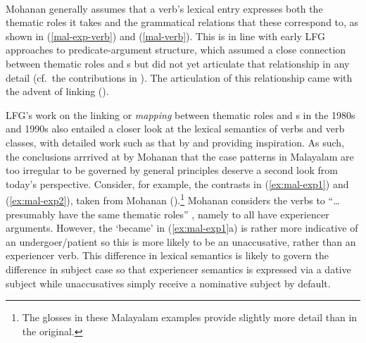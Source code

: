 \documentclass[output=paper,hidelinks]{langscibook}
\begin{document}
\begin{exe}
  \ex \label{mal-exp-verb} 
  \begin{xlist}
\ex {}\\
\ex  {}
\end{xlist}
\end{exe}

Mohanan generally assumes that a verb's lexical entry expresses
both the thematic roles it takes and the grammatical relations that these
correspond to, as shown in (\ref{mal-exp-verb}) and  (\ref{mal-verb}). 
This is in line with early LFG approaches to predicate-argument
structure, which assumed a close connection between thematic roles and
{\GF}s but did not yet articulate that relationship in any detail (cf.~the
contributions in \citealt{buttking2005}).   The articulation of this relationship came
with the advent of linking (). 

\ea \label{mal-verb}
\z

LFG's work on the  linking or {\em mapping} between thematic roles and {\GF}s in the
1980s and 1990s also entailed a closer look at the lexical semantics of verbs
and verb classes, with detailed work such as that by
\citet{jackendoff1990semantic}  and \citet{levin93} 
providing inspiration. As such, the conclusions
arrrived at by Mohanan that the case patterns in Malayalam are too irregular to
be governed by general principles deserve a second look from today's perspective. Consider, for example, the contrasts in (\ref{ex:mal-exp1}) and
(\ref{ex:mal-exp2}), taken from Mohanan (\citeyear[540--541]{mohanan1982}).\footnote{The
  glosses in these Malayalam examples provide slightly more detail than in the
  original.}  Mohanan considers the verbs  to ``\ldots presumably have the same
thematic roles''  \citep[540]{mohanan1982}, namely to all have experiencer
arguments.  However, the `became' in (\ref{ex:mal-exp1}a) is rather more indicative
of an undergoer/patient so this is more likely to be an unaccusative, rather
than an experiencer verb.  This difference in lexical semantics is likely to
govern the difference in subject case so that experiencer semantics is expressed
via 
a dative subject while unaccusatives simply receive a nominative subject by default. 
\end{document}
